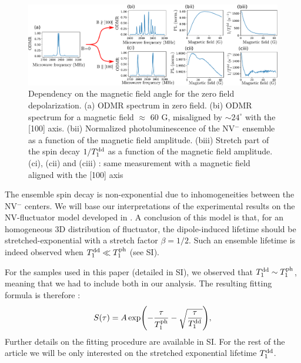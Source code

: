 \documentclass[preprintnumbers,amsmath,amssymb,superscriptaddress,twocolumn,showpacs]{revtex4-2}
\begin{document}
\begin{figure}
\includegraphics[width=.95\textwidth]{Figures/fig 100 vs 1x1x1x1}
\caption{Dependency on the magnetic field angle for the zero field depolarization. (a) ODMR spectrum in zero field. (bi) ODMR spectrum for a magnetic field $\approx$ 60 G, misaligned by $\sim  24^\circ$ with the [100] axis. (bii) Normalized photoluminescence of the NV$^-$ ensemble as a function of the magnetic field amplitude. (biii) Stretch part of the spin decay $1/T_1^{\rm dd}$ as a function of the magnetic field amplitude. (ci), (cii) and (ciii) : same measurement with a magnetic field aligned with the [100] axis}
\label{100_VS_1x4}
\end{figure}

The ensemble spin decay is non-exponential due to inhomogeneities between the NV$^-$ centers. We will base our interpretations of the experimental results on the NV-fluctuator model developed in \citep{choi_depolarization_2017}. A conclusion of this model is that, for an homogeneous 3D distribution of fluctuator, the dipole-induced lifetime should be stretched-exponential with a stretch factor $\beta=1/2$. Such an ensemble lifetime is indeed observed when $T_1^{\rm dd} \ll T_1^{\rm ph}$  (see SI).

For the samples used in this paper (detailed in SI), we observed that $T_1^{\rm dd} \sim T_1^{\rm ph}$, meaning that we had to include both  in our analysis. The resulting fitting formula is therefore :
\begin{equation}
S(\tau)=A \exp (-\frac{\tau}{T_1^{\rm ph}} -\sqrt{\frac{\tau}{T_1^{\rm dd}}}),
\end{equation}
Further details on the fitting procedure are available in SI. For the rest of the article we will be only interested on the stretched exponential lifetime ${T_1^{\rm dd}}$.

\end{document}
